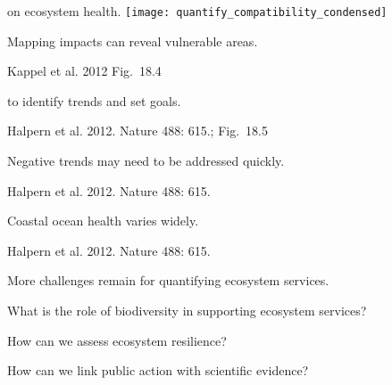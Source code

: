 \documentclass[t]{beamer}
\begin{document}
\begin{frame}[t]{ on ecosystem health.}
	\texttt{[image: quantify\_compatibility\_condensed]}
\end{frame}

{
\begin{frame}[b]{Mapping impacts can reveal vulnerable areas.}

\tiny Kappel et al. 2012 \hfill Fig.~18.4
\end{frame}
}

{
\begin{frame}[b]{ to identify trends and set goals.}

\tiny\hfill Halpern et al. 2012. Nature 488: 615.; Fig.~18.5
\end{frame}
}

{
\begin{frame}[b]{Negative trends may need to be addressed quickly.}

\tiny\hfill Halpern et al. 2012. Nature 488: 615.
\end{frame}
}

{
\begin{frame}[b]{Coastal ocean health varies widely.}

\tiny\hfill Halpern et al. 2012. Nature 488: 615.
\end{frame}
}


\begin{frame}[t]{More challenges remain for quantifying ecosystem services.}

\hangpara What is the role of biodiversity in supporting ecosystem services?

\hangpara How can we assess ecosystem resilience?

\hangpara How can we link public action with scientific evidence?

\end{frame}
\end{document}
